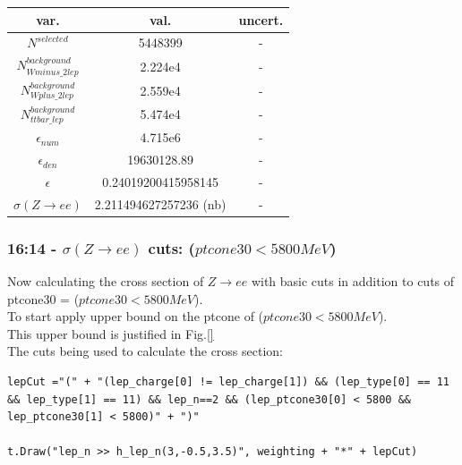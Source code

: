 \begin{tabular}{ | c | c | c |}
  \hline			
  var. & val. & uncert. \\
  \hline 
  
  $N^{selected}$ & 5448399 & - \\
  
  $N^{background}_{Wminus\_2lep}$ & 2.224e4 & - \\
  
  $N^{background}_{Wplus\_2lep}$ & 2.559e4 & - \\
  
  $N^{background}_{ttbar\_lep}$ & 5.474e4 & - \\
  
  $\epsilon_{num}$ & 4.715e6 & - \\
  
  $\epsilon_{den}$ & 19630128.89 & - \\
  \hline  
  $\epsilon$ & 0.24019200415958145 & - \\
  $\sigma(Z \rightarrow ee)$ &  2.211494627257236 (nb) & - \\
  \hline  
\end{tabular}

\subsubsection*{16:14 - $\sigma(Z \rightarrow ee)$ cuts: ($  ptcone30 < 5800 MeV $)}
Now calculating the cross section of $Z \rightarrow ee$ with basic cuts in addition to cuts of ptcone30 = ($  ptcone30 < 5800 MeV $).
\\
To start apply upper bound on the ptcone of ($ ptcone30 < 5800 MeV $).
\\
This upper bound is justified in Fig.\ref{}
\\
The cuts being used to calculate the cross section:
\begin{lstlisting}
lepCut ="(" + "(lep_charge[0] != lep_charge[1]) && (lep_type[0] == 11 && lep_type[1] == 11) && lep_n==2 && (lep_ptcone30[0] < 5800 && lep_ptcone30[1] < 5800)" + ")"    
  
t.Draw("lep_n >> h_lep_n(3,-0.5,3.5)", weighting + "*" + lepCut)
\end{lstlisting}

